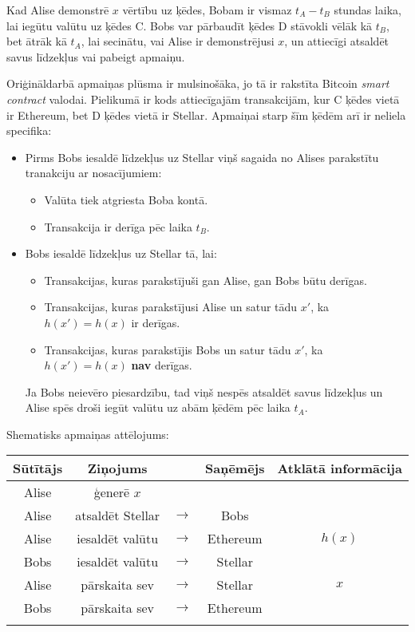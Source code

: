 Kad Alise demonstrē $x$ vērtību uz ķēdes, Bobam ir vismaz $t_A-t_B$ stundas laika, lai iegūtu valūtu uz ķēdes C.
Bobs var pārbaudīt ķēdes D stāvokli vēlāk kā $t_B$, bet ātrāk kā $t_A$, lai secinātu, vai Alise ir demonstrējusi $x$, un attiecīgi atsaldēt savus līdzekļus vai pabeigt apmaiņu.

Oriģināldarbā apmaiņas plūsma ir mulsinošāka, jo tā ir rakstīta Bitcoin \textit{smart contract} valodai. Pielikumā ir kods attiecīgajām transakcijām, kur C ķēdes vietā ir Ethereum, bet D ķēdes vietā ir Stellar. Apmaiņai starp šīm ķēdēm arī ir neliela specifika:
\begin{itemize}
    \item Pirms Bobs iesaldē līdzekļus uz Stellar viņš sagaida no Alises parakstītu tranakciju ar nosacījumiem:
        \begin{itemize}
            \item Valūta tiek atgriesta Boba kontā.
            \item Transakcija ir derīga pēc laika $t_B$.
        \end{itemize}
    \item Bobs iesaldē līdzekļus uz Stellar tā, lai:
        \begin{itemize}
            \item Transakcijas, kuras parakstījuši gan Alise, gan Bobs būtu derīgas.
            \item Transakcijas, kuras parakstījusi Alise un satur tādu $x'$, ka $h(x') = h(x)$ ir derīgas.
            \item Transakcijas, kuras parakstījis Bobs un satur tādu $x'$, ka $h(x') = h(x)$ \textbf{nav} derīgas.
        \end{itemize}
        Ja Bobs neievēro piesardzību, tad viņš nespēs atsaldēt savus līdzekļus un Alise spēs droši iegūt valūtu uz abām ķēdēm pēc laika $t_A$.
\end{itemize}
Shematisks apmaiņas attēlojums:\\
\begin{tabular}[]{c c c c c}
    Sūtītājs & Ziņojums & & Saņēmējs & Atklātā informācija \\
    \midrule
    Alise & ģenerē $x$ & & & \\
    Alise & atsaldēt Stellar & $\longrightarrow$ & Bobs & \\
    Alise & iesaldēt valūtu & $\longrightarrow$ & Ethereum & $h(x)$ \\
    Bobs & iesaldēt valūtu & $\longrightarrow$ & Stellar & \\
    Alise & pārskaita sev & $\longrightarrow$ & Stellar & $x$\\
    Bobs & pārskaita sev & $\longrightarrow$ & Ethereum & \\
    \\
\end{tabular}\\
